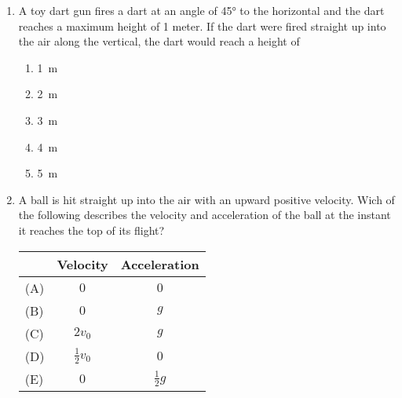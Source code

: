 \documentclass{../../../oss-apphys}
\begin{document}
\begin{multicols}{2}
\begin{enumerate}[resume,leftmargin=18pt]
  \item A toy dart gun fires a dart at an angle of \ang{45} to the
    horizontal and the dart reaches a maximum height of 1 meter. If the dart
    were fired straight up into the air along the vertical, the dart would
    reach a height of
    \begin{enumerate}[nosep,leftmargin=18pt,label=(\Alph*)]
    \item\SI{1}{\metre}
    \item\SI{2}{\metre}
    \item\SI{3}{\metre}
    \item\SI{4}{\metre}
    \item\SI{5}{\metre}
    \end{enumerate}

  \item A ball is hit straight up into the air with an upward positive
    velocity. Wich of the following describes the velocity and acceleration
    of the ball at the instant it reaches the top of its flight?

    \begin{tabular}{lcc}
      & Velocity & Acceleration\\ \hline
      (A) & $0$ & $0$\\
      (B) & $0$ & $g$\\
      (C) & $2v_0$ & $g$\\
      (D) & $\displaystyle\frac12v_0$ & $0$\\
      (E) & $0$ & $\displaystyle\frac12g$
    \end{tabular}    
    \vspace{.65in}


\end{enumerate}
\end{multicols}
\end{document}
